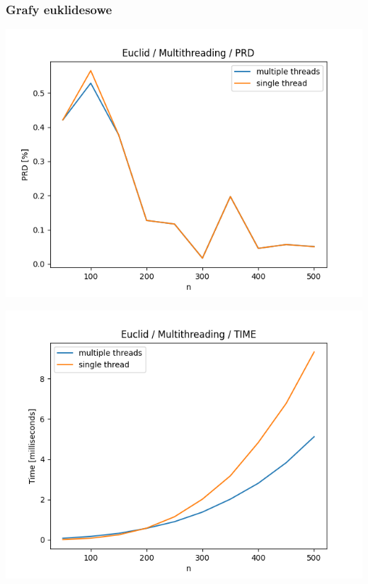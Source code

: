\documentclass{article}
\begin{document}
\subsubsection{Grafy euklidesowe}

\begin{center}
\includegraphics[width=\textwidth, 
                   height = 0.4\textheight, 
                   keepaspectratio]
                  {plots/multithreading_euclid_prd} 
\end{center}

\begin{center}
\includegraphics[width=\textwidth, 
                   height = 0.4\textheight, 
                   keepaspectratio]
                  {plots/multithreading_euclid_time} 
\end{center}
\end{document}
